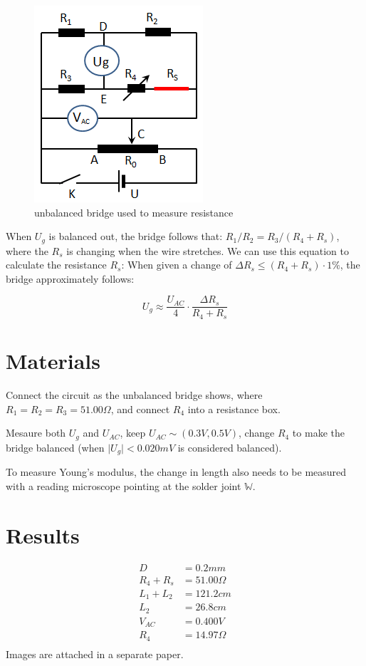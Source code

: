 \documentclass[a4paper]{article}
\begin{document}
\begin{multicols*}{2}
    \begin{figure}[H]
        \centering
        \includegraphics[width=0.5\linewidth]{./img/Fig.1.png}
        \caption{unbalanced bridge used to measure resistance}
        \label{fig:figure1}
    \end{figure}

    When $U_g$ is balanced out, the bridge follows that: $R_1 / R_2 = R_3 /(R_4 + R_s)$, where the $R_s$ is changing when the wire stretches. We can use this equation to calculate the resistance $R_s$: When given a change of $\Delta R_s\leq(R_4 + R_s)\cdot1\%$, the bridge approximately follows:

    \begin{equation}
        U_g \approx \frac{U_{AC}}{4}\cdot\frac{\Delta R_s}{R_4 + R_s}
    \end{equation}

    \section*{Materials}
    Connect the circuit as the unbalanced bridge shows, where $R_1 = R_2 = R_3 = 51.00\Omega$, and connect $R_4$ into a resistance box.

    Mesaure both $U_g$ and $U_{AC}$, keep $U_{AC}\sim (0.3V, 0.5V)$, change $R_4$ to make the bridge balanced (when $\mid U_g\mid < 0.020mV$ is considered balanced).

    To measure Young's modulus, the change in length also needs to be measured with a reading microscope pointing at the solder joint $\mathbb{W}$.

    \section*{Results}
    \begin{equation}
        \begin{aligned}
            D &= 0.2mm \\
            R_4 + R_s &= 51.00\Omega\\
            L_1 + L_2 &= 121.2cm\\
            L_2 &= 26.8cm\\
            V_{AC} &= 0.400V\\
            R_4 &= 14.97\Omega\\
        \end{aligned}
    \end{equation}
    Images are attached in a separate paper.

\end{multicols*}
\end{document}
